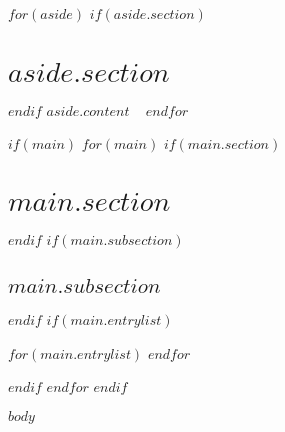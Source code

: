 \documentclass{friggeri-cv-a4}
\begin{document}

\begin{aside}
$for(aside)$
$if(aside.section)$
\section{$aside.section$}
$endif$
$aside.content$
~
$endfor$
\end{aside}

$if(main)$
$for(main)$
$if(main.section)$
\section{$main.section$}
$endif$
$if(main.subsection)$
\subsection{$main.subsection$}
$endif$
$if(main.entrylist)$
\begin{entrylist}
$for(main.entrylist)$
$endfor$
\end{entrylist}
$endif$
$endfor$
$endif$

$body$
\end{document}
